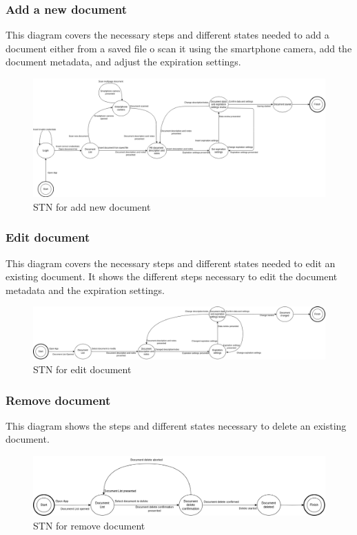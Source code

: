 \subsubsection{Add a new document}
This diagram covers the necessary steps and different states needed to add a document either from a saved file o scan it using the smartphone camera, add the document metadata, and adjust the expiration settings.
\begin{figure}[H]
	\centering
	\includegraphics[width=\textwidth]{../Draw.io diagrams/document_add_STN.drawio.png}  %
	\caption{STN for add new document}
\end{figure}
\subsubsection{Edit document}
This diagram covers the necessary steps and different states needed to edit an existing document. It shows the different steps necessary to edit the document metadata and the expiration settings.
\begin{figure}[H]
	\centering
	\includegraphics[width=\textwidth]{../Draw.io diagrams/document_edit_STN.drawio.png}  %
	\caption{STN for edit document}
\end{figure}
\subsubsection{Remove document}
This diagram shows the steps and different states necessary to delete an existing document.
\begin{figure}[H]
	\centering
	\includegraphics[width=\textwidth]{../Draw.io diagrams/document_delete_STN.drawio.png}  %
	\caption{STN for remove document}
\end{figure}
